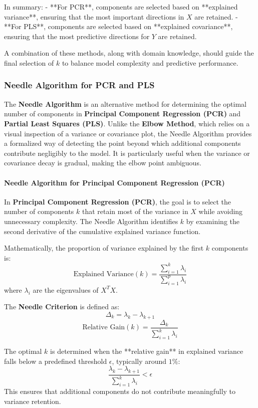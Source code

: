 \documentclass[11pt,twoside,a4paper]{article}
\begin{document}
In summary:
- **For PCR**, components are selected based on **explained variance**, ensuring that the most important directions in \( X \) are retained.
- **For PLS**, components are selected based on **explained covariance**, ensuring that the most predictive directions for \( Y \) are retained.

A combination of these methods, along with domain knowledge, should guide the final selection of \( k \) to balance model complexity and predictive performance.

\subsubsection{Needle Algorithm for PCR and PLS}
The \textbf{Needle Algorithm} is an alternative method for determining the optimal number of components in \textbf{Principal Component Regression (PCR)} and \textbf{Partial Least Squares (PLS)}. Unlike the \textbf{Elbow Method}, which relies on a visual inspection of a variance or covariance plot, the Needle Algorithm provides a formalized way of detecting the point beyond which additional components contribute negligibly to the model. It is particularly useful when the variance or covariance decay is gradual, making the elbow point ambiguous.

\paragraph{Needle Algorithm for Principal Component Regression (PCR)}
In \textbf{Principal Component Regression (PCR)}, the goal is to select the number of components \( k \) that retain most of the variance in \( X \) while avoiding unnecessary complexity. The Needle Algorithm identifies \( k \) by examining the second derivative of the cumulative explained variance function.

Mathematically, the proportion of variance explained by the first \( k \) components is:
\[
\text{Explained Variance}(k) = \frac{\sum_{i=1}^{k} \lambda_i}{\sum_{i=1}^{p} \lambda_i}
\]
where \( \lambda_i \) are the eigenvalues of \( X^T X \). 

The \textbf{Needle Criterion} is defined as:
\[
\Delta_k = \lambda_k - \lambda_{k+1}
\]
\[
\text{Relative Gain}(k) = \frac{\Delta_k}{\sum_{i=1}^{k} \lambda_i}
\]

The optimal \( k \) is determined when the **relative gain** in explained variance falls below a predefined threshold \( \epsilon \), typically around \( 1\% \):
\[
\frac{\lambda_k - \lambda_{k+1}}{\sum_{i=1}^{k} \lambda_i} < \epsilon
\]
This ensures that additional components do not contribute meaningfully to variance retention.
\end{document}
